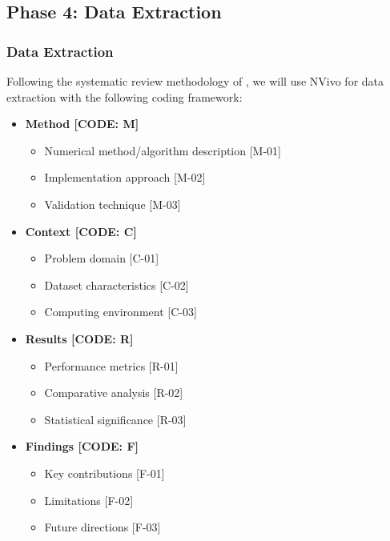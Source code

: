 \documentclass[a4paper,12pt]{article}
\begin{document}
\subsection{Phase 4: Data Extraction}

\subsubsection{Data Extraction}
Following the systematic review methodology of \cite{kitchenham2007guidelines}, we will use NVivo for data extraction with the following coding framework:

\begin{itemize}
    \item \textbf{Method [CODE: M]}
    \begin{itemize}
        \item Numerical method/algorithm description [M-01]
        \item Implementation approach [M-02]
        \item Validation technique [M-03]
    \end{itemize}
    
    \item \textbf{Context [CODE: C]}
    \begin{itemize}
        \item Problem domain [C-01]
        \item Dataset characteristics [C-02]
        \item Computing environment [C-03]
    \end{itemize}
    
    \item \textbf{Results [CODE: R]}
    \begin{itemize}
        \item Performance metrics [R-01]
        \item Comparative analysis [R-02]
        \item Statistical significance [R-03]
    \end{itemize}
    
    \item \textbf{Findings [CODE: F]}
    \begin{itemize}
        \item Key contributions [F-01]
        \item Limitations [F-02]
        \item Future directions [F-03]
    \end{itemize}
\end{itemize}
\end{document}
